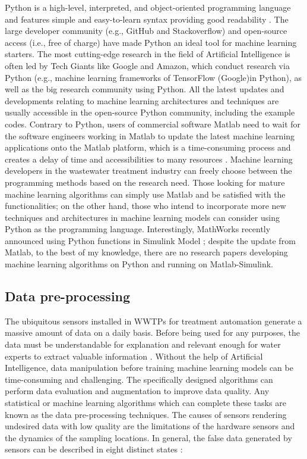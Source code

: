 Python is a high-level, interpreted, and object-oriented programming language and features simple and easy-to-learn syntax providing good readability \citep{WhatPythonExecutive}. The large developer community (e.g., GitHub and Stackoverflow) and open-source access (i.e., free of charge) have made Python an ideal tool for machine learning starters. The most cutting-edge research in the field of Artificial Intelligence is often led by Tech Giants like Google and Amazon, which conduct research via Python (e.g., machine learning frameworks of TensorFlow (Google)in Python), as well as the big research community using Python. All the latest updates and developments relating to machine learning architectures and techniques are usually accessible in the open-source Python community, including the example codes. Contrary to Python, users of commercial software Matlab need to wait for the software engineers working in Matlab to update the latest machine learning applications onto the Matlab platform, which is a time-consuming process and creates a delay of time and accessibilities to many resources \citep{castroWhyShouldChoose2018}. Machine learning developers in the wastewater treatment industry can freely choose between the programming methods based on the research need. Those looking for mature machine learning algorithms can simply use Matlab and be satisfied with the functionalities; on the other hand, those who intend to incorporate more new techniques and architectures in machine learning models can consider using Python as the programming language. Interestingly, MathWorks recently announced using Python functions in Simulink Model \citep{mathworksCallPythonFunction2022}; despite the update from Matlab, to the best of my knowledge, there are no research papers developing machine learning algorithms on Python and running on Matlab-Simulink. 

\subsection{Data pre-processing}
The ubiquitous sensors installed in WWTPs for treatment automation generate a massive amount of data on a daily basis. Before being used for any purposes, the data must be understandable for explanation and relevant enough for water experts to extract valuable information \citep{kehreinCriticalReviewResource2020}. Without the help of Artificial Intelligence, data manipulation before training machine learning models can be time-consuming and challenging. The specifically designed algorithms can perform data evaluation and augmentation to improve data quality. Any statistical or machine learning algorithms which can complete these tasks are known as the data pre-processing techniques. The causes of sensors rendering undesired data with low quality are the limitations of the hardware sensors and the dynamics of the sampling locations. In general, the false data generated by sensors can be described in eight distinct states \citep{rosenAddingRealismSimulated2008,newhartDatadrivenPerformanceAnalyses2019}:

